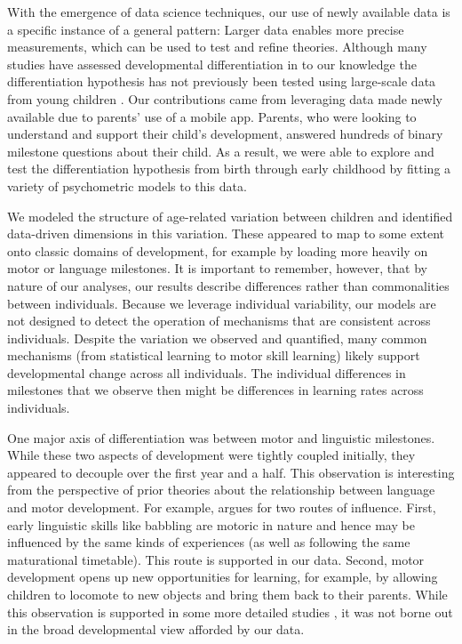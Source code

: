 \documentclass[man, floatsintext]{apa7}
\begin{document}
With the emergence of data science techniques, our use of newly
available data is a specific instance of a general pattern: Larger data
enables more precise measurements, which can be used to test and refine theories.
Although many studies have assessed developmental differentiation in
to our knowledge the differentiation hypothesis has not previously been tested using large-scale
data from young children \cite{breit2021}.
Our contributions came from leveraging data made newly available
due to parents' use of a mobile app. Parents, who were looking to understand and
support their child's development, answered hundreds of binary milestone
questions about their child. As a result, we were able to explore and
test the differentiation hypothesis from birth through early childhood by fitting a
variety of psychometric models to this data.

We modeled the structure of age-related variation between children and identified data-driven dimensions in this variation. These appeared to map to some extent onto classic domains of development, for example by loading more heavily on motor or language milestones.
It is important to remember, however, that by nature of our analyses, our results describe differences rather than commonalities between individuals. Because we leverage individual variability, our models are not designed to detect the operation of mechanisms that are consistent across individuals. Despite the variation we observed and quantified,
many common mechanisms (from statistical learning to motor skill learning) likely support developmental change across all individuals. The individual differences in milestones that we observe then might be differences in learning rates across individuals.

One major axis of differentiation was between motor and linguistic milestones. While these two aspects of development were tightly coupled initially, they appeared to decouple over the first year and a half. This observation is interesting from the perspective of prior theories about the relationship between language and motor development. For example, \cite{iverson2010} argues for two routes of influence. First, early linguistic skills like babbling are motoric in nature and hence may be influenced by the same kinds of experiences (as well as following the same maturational timetable). This route is supported in our data. Second, motor development opens up new opportunities for learning, for example, by allowing children to locomote to new objects and bring them back to their parents. While this observation is supported in some more detailed studies \parencite[e.g.,][]{walle2014,karasik2014}, it was not borne out in the broad developmental view afforded by our data.
\end{document}
